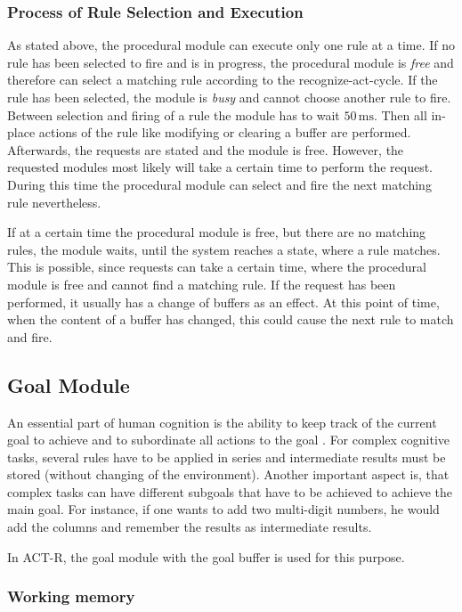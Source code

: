 \subsubsection{Process of Rule Selection and Execution}

As stated above, the procedural module can execute only one rule at a time. If no rule has been selected to fire and is in progress, the procedural module is \emph{free} and therefore can select a matching rule according to the recognize-act-cycle. If the rule has been selected, the module is \emph{busy} and cannot choose another rule to fire. Between selection and firing of a rule the module has to wait $50\,\mathrm{ms}$. Then all in-place actions of the rule like modifying or clearing a buffer are performed. Afterwards, the requests are stated and the module is free. However, the requested modules most likely will take a certain time to perform the request. During this time the procedural module can select and fire the next matching rule nevertheless.

If at a certain time the procedural module is free, but there are no matching rules, the module waits, until the system reaches a state, where a rule matches. This is possible, since requests can take a certain time, where the procedural module is free and cannot find a matching rule. If the request has been performed, it usually has a change of buffers as an effect. At this point of time, when the content of a buffer has changed, this could cause the next rule to match and fire.

\subsection{Goal Module}

An essential part of human cognition is the ability to keep track of the current goal to achieve and to subordinate all actions to the goal \cite[p. 1041]{anderson_integrated_2004}. For complex cognitive tasks, several rules have to be applied in series and intermediate results must be stored (without changing of the environment). Another important aspect is, that complex tasks can have different subgoals that have to be achieved to achieve the main goal. For instance, if one wants to add two multi-digit numbers, he would add the columns and remember the results as intermediate results.

In ACT-R, the goal module with the goal buffer is used for this purpose. 

\subsubsection{Working memory}

